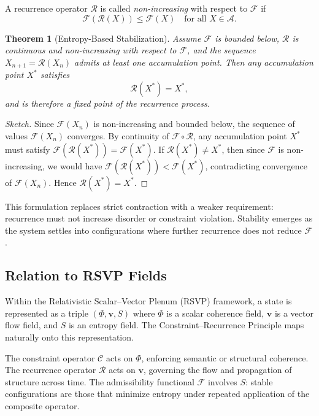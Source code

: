 \documentclass[12pt, oneside]{article}
\newtheorem{theorem}{Theorem}[section]
\theoremstyle{definition}
\theoremstyle{remark}
\begin{document}
A recurrence operator $\mathcal{R}$ is called \emph{non-increasing} with respect to $\mathcal{F}$ if
\[
\mathcal{F}(\mathcal{R}(X)) \leq \mathcal{F}(X) \quad \text{for all } X \in \mathcal{A}.
\]

\begin{theorem}[Entropy-Based Stabilization]
\label{thm:entropy}
Assume $\mathcal{F}$ is bounded below, $\mathcal{R}$ is continuous and non-increasing with respect to $\mathcal{F}$, and the sequence $X_{n+1} = \mathcal{R}(X_{n})$ admits at least one accumulation point.
Then any accumulation point $X^{*}$ satisfies
\[
\mathcal{R}(X^{*}) = X^{*},
\]
and is therefore a fixed point of the recurrence process.
\end{theorem}

\begin{proof}[Sketch]
Since $\mathcal{F}(X_{n})$ is non-increasing and bounded below, the sequence of values $\mathcal{F}(X_{n})$ converges.
By continuity of $\mathcal{F} \circ \mathcal{R}$, any accumulation point $X^{*}$ must satisfy
$\mathcal{F}(\mathcal{R}(X^{*})) = \mathcal{F}(X^{*})$.
If $\mathcal{R}(X^{*}) \neq X^{*}$, then since $\mathcal{F}$ is non-increasing, we would have $\mathcal{F}(\mathcal{R}(X^{*})) < \mathcal{F}(X^{*})$, contradicting convergence of $\mathcal{F}(X_{n})$.
Hence $\mathcal{R}(X^{*}) = X^{*}$.
\end{proof}

This formulation replaces strict contraction with a weaker requirement: recurrence must not increase disorder or constraint violation.
Stability emerges as the system settles into configurations where further recurrence does not reduce $\mathcal{F}$.

\subsection{Relation to RSVP Fields}

Within the Relativistic Scalar--Vector Plenum (RSVP) framework, a state is represented as a triple $(\Phi, \mathbf{v}, S)$ where $\Phi$ is a scalar coherence field, $\mathbf{v}$ is a vector flow field, and $S$ is an entropy field.
The Constraint--Recurrence Principle maps naturally onto this representation.

The constraint operator $\mathcal{C}$ acts on $\Phi$, enforcing semantic or structural coherence.
The recurrence operator $\mathcal{R}$ acts on $\mathbf{v}$, governing the flow and propagation of structure across time.
The admissibility functional $\mathcal{F}$ involves $S$: stable configurations are those that minimize entropy under repeated application of the composite operator.
\end{document}
